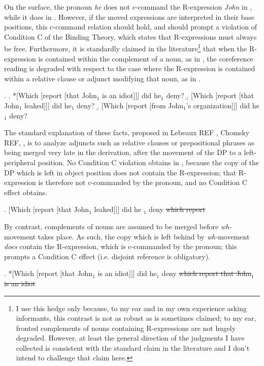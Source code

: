 \documentclass[11pt,letterpaper]{article}
\begin{document}
On the surface, the pronoun {\it he} does not c-command the R-expression {\it John} in \Last[b, c], while it does in \Last[a]. However, if the moved expressions are interpreted in their base positions, this c-command relation should hold, and should prompt a violation of Condition C of the Binding Theory, which states that R-expressions must always be free. Furthermore, it is standardly claimed in the literature\footnote{I use this hedge only because, to my ear and in my own experience asking informants, this contrast is not as robust as is sometimes claimed; to my ear, fronted complements of nouns containing R-expressions are not hugely degraded. However, at least the general direction of the judgments I have collected is consistent with the standard claim in the literature and I don't intend to challenge that claim here.} that when the R-expression is contained within the complement of a noun, as in \Next[a], the coreference reading is degraded with respect to the case where the R-expression is contained within a relative clause or adjunct modifying that noun, as in \Next[b, c].

\ex. 	\a. *[Which [report [that John$_1$ is an idiot]]] did he$_1$ deny?
	\b. [Which [report [that John$_1$ leaked]]] did he$_1$ deny?
	\b. [Which [report [from John$_1$'s organization]]] did he$_1$ deny? 

The standard explanation of these facts, proposed in Lebeaux REF %
, Chomsky REF, %
\cite{Fox99}, %
 is to analyze adjuncts such as relative clauses or prepositional phrases as being merged very late in the derivation, after the movement of the DP to a left-peripheral position. No Condition C violation obtains in \Last[b, c], because the copy of the DP which is left in object position does not contain the R-expression; that R-expression is therefore not c-commanded by the pronoun, and no Condition C effect obtains.

\ex. 	[Which [report [that John$_1$ leaked]]] did he $_1$ deny \sout{which report}

By contrast, complements of nouns are assumed to be merged before {\it wh-}movement takes place. As such, the copy which is left behind by {\it wh-}movement \emph{does} contain the R-expression, which is c-commanded by the pronoun; this prompts a Condition C effect (i.e. disjoint reference is obligatory).

\ex. 	*[Which [report [that John$_1$ is an idiot]]] did he$_1$ deny \sout{which report that John$_1$ is an idiot}
\end{document}
